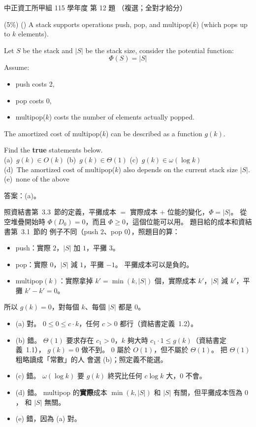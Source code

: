 \begin{pastexam}[label={px:ccu-115-swa-02}]{中正資工所甲組 115 學年度 第 12 題}
（複選；全對才給分）

(5\%) (\qquad) A stack supports operations push, pop, and multipop($k$) (which pops up to $k$
elements).

Let $S$ be the stack and $|S|$ be the stack size, consider the potential function:
\[\Phi(S)=|S|\]
Assume:
\begin{itemize}
\item push costs 2,
\item pop costs 0,
\item multipop($k$) costs the number of elements actually popped.
\end{itemize}
The amortized cost of multipop($k$) can be described as a function $g(k)$.

Find the \textbf{true} statements below.\\
(a)~$g(k)\in O(k)$ \qquad (b)~$g(k)\in\Theta(1)$ \qquad (c)~$g(k)\in\omega(\log k)$\\
(d)~The amortized cost of multipop($k$) also depends on the current stack size $|S|$.\\
(e)~none of the above
\end{pastexam}

\begin{pastsoln}
答案：(a)。

照資結書第~3.3~節的定義，平攤成本 $=$ 實際成本 $+$ 位能的變化，$\Phi = |S|$。 從空堆疊開始時
$\Phi(D_0) = 0$，而且 $\Phi \ge 0$，這個位能可以用。 題目給的成本和資結書第~3.1~節的
 例子不同（push $2$、pop $0$），照題目的算：
\begin{itemize}
\item push：實際 $2$，$|S|$ 加 $1$，平攤 $3$。
\item pop：實際 $0$，$|S|$ 減 $1$，平攤 $-1$。 平攤成本可以是負的。
\item multipop$(k)$：實際拿掉 $k' = \min(k, |S|)$ 個，實際成本 $k'$，$|S|$ 減 $k'$，平攤
$k' - k' = 0$。
\end{itemize}
所以 $g(k) = 0$，對每個 $k$、每個 $|S|$ 都是 $0$。
\begin{itemize}
\item (a) 對。 $0 \le 0 \le c \cdot k$，任何 $c > 0$ 都行（資結書定義~1.2）。
\item (b) 錯。 $\Theta(1)$ 要求存在 $c_1 > 0$，$k$ 夠大時 $c_1 \cdot 1 \le g(k)$（資結書定義~1.1），
$g(k) = 0$ 做不到。 $0$ 屬於 $O(1)$，但不屬於 $\Theta(1)$。 把 $\Theta(1)$ 粗略讀成「常數」的人
會選 (b)；照定義不能選。
\item (c) 錯。 $\omega(\log k)$ 要 $g(k)$ 終究比任何 $c\log k$ 大，$0$ 不會。
\item (d) 錯。 multipop 的\textbf{實際}成本 $\min(k, |S|)$ 和 $|S|$ 有關，但平攤成本恆為 $0$，
和 $|S|$ 無關。
\item (e) 錯，因為 (a) 對。
\end{itemize}
\end{pastsoln}
